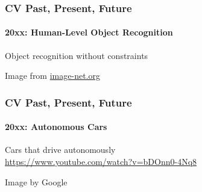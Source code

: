 \documentclass[xetex,professionalfont]{beamer}
\begin{document}
\begin{frame}
\frametitle{CV Past, Present, Future}
\framesubtitle{20xx: Human-Level Object Recognition}

Object recognition without constraints %

\bigskip
\begin{center}
    {\centering Image from \url{image-net.org}}
\end{center}

\end{frame}


\begin{frame}
\frametitle{CV Past, Present, Future}
\framesubtitle{20xx: Autonomous Cars}

Cars that drive autonomously\\\medskip
\url{https://www.youtube.com/watch?v=bDOnn0-4Nq8}

\bigskip
\begin{center}
    {\centering Image by Google}
\end{center}

\end{frame}

\end{document}
